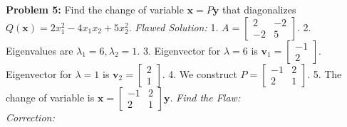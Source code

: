 \documentclass[11pt, letterpaper]{article}
\theoremstyle{definition}
\theoremstyle{remark}
\begin{document}
\vspace{1em}
\textbf{Problem 5:} Find the change of variable $\mathbf{x} = P\mathbf{y}$ that diagonalizes $Q(\mathbf{x}) = 2x_1^2 - 4x_1x_2 + 5x_2^2$.
\textit{Flawed Solution:}
1. $A = \begin{bmatrix} 2 & -2 \\ -2 & 5 \end{bmatrix}$.
2. Eigenvalues are $\lambda_1 = 6, \lambda_2 = 1$.
3. Eigenvector for $\lambda=6$ is $\mathbf{v}_1 = \begin{bmatrix} -1 \\ 2 \end{bmatrix}$. Eigenvector for $\lambda=1$ is $\mathbf{v}_2 = \begin{bmatrix} 2 \\ 1 \end{bmatrix}$.
4. We construct $P = \begin{bmatrix} -1 & 2 \\ 2 & 1 \end{bmatrix}$.
5. The change of variable is $\mathbf{x} = \begin{bmatrix} -1 & 2 \\ 2 & 1 \end{bmatrix} \mathbf{y}$.
\textit{Find the Flaw:} \hrulefill \\
\textit{Correction:} \hrulefill
\end{document}
